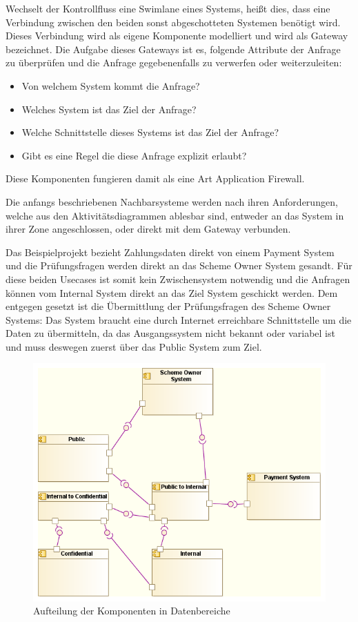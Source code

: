 Wechselt der Kontrollfluss eine Swimlane eines Systems, heißt dies, dass eine Verbindung zwischen den beiden sonst abgeschotteten Systemen benötigt wird. Dieses Verbindung wird als eigene Komponente modelliert und wird als Gateway bezeichnet. Die Aufgabe dieses Gateways ist es, folgende Attribute der Anfrage zu überprüfen und die Anfrage gegebenenfalls zu verwerfen oder weiterzuleiten:

\begin{itemize}
  \item Von welchem System kommt die Anfrage?
  \item Welches System ist das Ziel der Anfrage?
  \item Welche Schnittstelle dieses Systems ist das Ziel der Anfrage?
  \item Gibt es eine Regel die diese Anfrage explizit erlaubt?
\end{itemize}

Diese Komponenten fungieren damit als eine Art Application Firewall.

Die anfangs beschriebenen Nachbarsysteme werden nach ihren Anforderungen, welche aus den Aktivitätsdiagrammen ablesbar sind, entweder an das System in ihrer Zone angeschlossen, oder direkt mit dem Gateway verbunden.

Das Beispielprojekt bezieht Zahlungsdaten direkt von einem Payment System und die Prüfungsfragen werden direkt an das Scheme Owner System gesandt. Für diese beiden Usecases ist somit kein Zwischensystem notwendig und die Anfragen können vom Internal System direkt an das Ziel System geschickt werden. Dem entgegen gesetzt ist die Übermittlung der Prüfungsfragen des Scheme Owner Systems: Das System braucht eine durch Internet erreichbare Schnittstelle um die Daten zu übermitteln, da das Ausgangssystem nicht bekannt oder variabel ist und muss deswegen zuerst über das Public System zum Ziel.

\begin{figure}[H]
    \centering
    \includegraphics[scale=0.7]{uml/dataarch.png}
    \caption{Aufteilung der Komponenten in Datenbereiche}
\end{figure}

